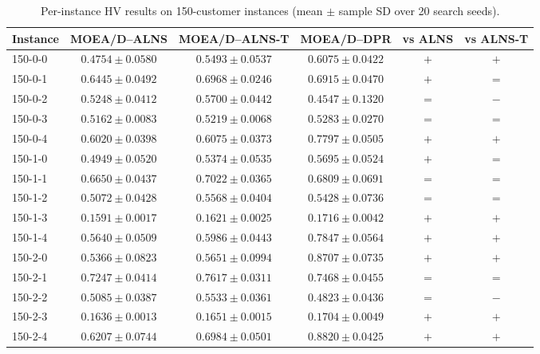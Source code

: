 \begin{table}[t]
\centering
\caption{Per-instance HV results on 150-customer instances (mean $\pm$ sample SD over 20 search seeds).}
\begin{tabular}{lccccc}
\toprule
Instance & MOEA/D--ALNS & MOEA/D--ALNS-T & MOEA/D--DPR & vs ALNS & vs ALNS-T \\
\midrule
150-0-0 & $0.4754 \pm 0.0580$ & $0.5493 \pm 0.0537$ & $\mathbf{0.6075 \pm 0.0422}$ & $+$ & $+$ \\
150-0-1 & $0.6445 \pm 0.0492$ & $\mathbf{0.6968 \pm 0.0246}$ & $0.6915 \pm 0.0470$ & $+$ & $=$ \\
150-0-2 & $0.5248 \pm 0.0412$ & $\mathbf{0.5700 \pm 0.0442}$ & $0.4547 \pm 0.1320$ & $=$ & $-$ \\
150-0-3 & $0.5162 \pm 0.0083$ & $0.5219 \pm 0.0068$ & $\mathbf{0.5283 \pm 0.0270}$ & $=$ & $=$ \\
150-0-4 & $0.6020 \pm 0.0398$ & $0.6075 \pm 0.0373$ & $\mathbf{0.7797 \pm 0.0505}$ & $+$ & $+$ \\
150-1-0 & $0.4949 \pm 0.0520$ & $0.5374 \pm 0.0535$ & $\mathbf{0.5695 \pm 0.0524}$ & $+$ & $=$ \\
150-1-1 & $0.6650 \pm 0.0437$ & $\mathbf{0.7022 \pm 0.0365}$ & $0.6809 \pm 0.0691$ & $=$ & $=$ \\
150-1-2 & $0.5072 \pm 0.0428$ & $\mathbf{0.5568 \pm 0.0404}$ & $0.5428 \pm 0.0736$ & $=$ & $=$ \\
150-1-3 & $0.1591 \pm 0.0017$ & $0.1621 \pm 0.0025$ & $\mathbf{0.1716 \pm 0.0042}$ & $+$ & $+$ \\
150-1-4 & $0.5640 \pm 0.0509$ & $0.5986 \pm 0.0443$ & $\mathbf{0.7847 \pm 0.0564}$ & $+$ & $+$ \\
150-2-0 & $0.5366 \pm 0.0823$ & $0.5651 \pm 0.0994$ & $\mathbf{0.8707 \pm 0.0735}$ & $+$ & $+$ \\
150-2-1 & $0.7247 \pm 0.0414$ & $\mathbf{0.7617 \pm 0.0311}$ & $0.7468 \pm 0.0455$ & $=$ & $=$ \\
150-2-2 & $0.5085 \pm 0.0387$ & $\mathbf{0.5533 \pm 0.0361}$ & $0.4823 \pm 0.0436$ & $=$ & $-$ \\
150-2-3 & $0.1636 \pm 0.0013$ & $0.1651 \pm 0.0015$ & $\mathbf{0.1704 \pm 0.0049}$ & $+$ & $+$ \\
150-2-4 & $0.6207 \pm 0.0744$ & $0.6984 \pm 0.0501$ & $\mathbf{0.8820 \pm 0.0425}$ & $+$ & $+$ \\
\bottomrule
\end{tabular}
\end{table}

